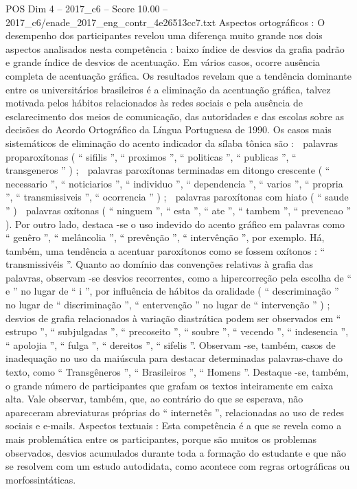 \begin{textsample}{POS Dim 4 – 2017\_c6 – Score 10.00 – 2017\_c6/enade\_2017\_eng\_contr\_4e26513cc7.txt}
Aspectos ortográficos : O desempenho dos participantes revelou uma diferença muito grande nos dois aspectos analisados nesta competência : baixo índice de desvios da grafia padrão e grande índice de desvios de acentuação.
Em vários casos, ocorre ausência completa de acentuação gráfica.
Os resultados revelam que a tendência dominante entre os universitários brasileiros é a eliminação da acentuação gráfica, talvez motivada pelos hábitos relacionados às redes sociais e pela ausência de esclarecimento dos meios de comunicação, das autoridades e das escolas sobre as decisões do Acordo Ortográfico da Língua Portuguesa de 1990.
Os casos mais sistemáticos de eliminação do acento indicador da sílaba tônica são :  palavras proparoxítonas ( “ sifilis ”, “ proximos ”, “ politicas ”, “ publicas ”, “ transgeneros ” ) ;  palavras paroxítonas terminadas em ditongo crescente ( “ necessario ”, “ noticiarios ”, “ individuo ”, “ dependencia ”, “ varios ”, “ propria ”, “ transmissiveis ”, “ ocorrencia ” ) ;  palavras paroxítonas com hiato ( “ saude ” )  palavras oxítonas ( “ ninguem ”, “ esta ”, “ ate ”, “ tambem ”, “ prevencao ” ).
Por outro lado, destaca -se o uso indevido do acento gráfico em palavras como “ genêro ”, “ melâncolia ”, “ prevênção ”, “ intervênção ”, por exemplo.
Há, também, uma tendência a acentuar paroxítonos como se fossem oxítonos : “ transmissivéis ”.
Quanto ao domínio das convenções relativas à grafia das palavras, observam -se desvios recorrentes, como a hipercorreção pela escolha de “ e ” no lugar de “ i ”, por influência de hábitos da oralidade ( “ descriminação ” no lugar de “ discriminação ”, “ entervenção ” no lugar de “ intervenção ” ) ; desvios de grafia relacionados à variação diastrática podem ser observados em “ estrupo ”, “ subjulgadas ”, “ precoseito ”, “ soubre ”, “ vecendo ”, “ indesencia ”, “ apolojia ”, “ fulga ”, “ dereitos ”, “ sifelis ”.
Observam -se, também, casos de inadequação no uso da maiúscula para destacar determinadas palavras-chave do texto, como “ Transgêneros ”, “ Brasileiros ”, “ Homens ”.
Destaque -se, também, o grande número de participantes que grafam os textos inteiramente em caixa alta.
Vale observar, também, que, ao contrário do que se esperava, não apareceram abreviaturas próprias do “ internetês ”, relacionadas ao uso de redes sociais e e-mails.
Aspectos textuais : Esta competência é a que se revela como a mais problemática entre os participantes, porque são muitos os problemas observados, desvios acumulados durante toda a formação do estudante e que não se resolvem com um estudo autodidata, como acontece com regras ortográficas ou morfossintáticas.

\end{textsample}
